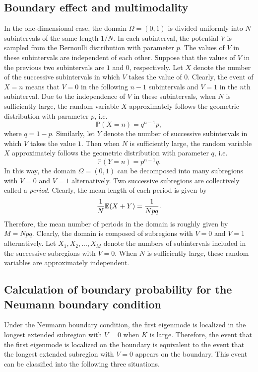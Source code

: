 \documentclass[a4paper,11pt]{article}
\begin{document}
\begin{appendices}
\section{Boundary effect and multimodality}\label{appB}
In the one-dimensional case, the domain $\Omega = (0, 1)$ is divided uniformly into $N$ subintervals of the same length $1/N$. In each subinterval, the potential $V$ is sampled from the Bernoulli distribution with parameter $p$. The values of $V$ in these subintervals are independent of each other. Suppose that the values of $V$ in the previous two subintervals are $1$ and $0$, respectively. Let $X$ denote the number of the successive subintervals in which $V$ takes the value of $0$. Clearly, the event of $X = n$ means that $V = 0$ in the following $n-1$ subintervals and $V = 1$ in the $n$th subinterval. Due to the independence of $V$ in these subintervals, when $N$ is sufficiently large, the random variable $X$ approximately follows the geometric distribution with parameter $p$, i.e.
\begin{equation*}
\mathbb{P}(X = n) = q^{n-1} p,
\end{equation*}
where $q = 1 - p$. Similarly, let $Y$ denote the number of successive subintervals in which $V$ takes the value $1$. Then when $N$ is sufficiently large, the random variable $X$ approximately follows the geometric distribution with parameter $q$, i.e.
\begin{equation*}
\mathbb{P}(Y = n) = p^{n-1} q.
\end{equation*}
In this way, the domain $\Omega = (0,1)$ can be decomposed into many subregions with $V = 0$ and $V = 1$ alternatively. Two successive subregions are collectively called a \emph{period}. Clearly, the mean length of each period is given by
\begin{equation*}
\frac{1}{N}\mathbb{E}(X+Y) = \frac{1}{Npq}.
\end{equation*}
Therefore, the mean number of periods in the domain is roughly given by $M = N p q$. Clearly, the domain is composed of subregions with $V = 0$ and $V = 1$ alternatively. Let $X_1, X_2, ..., X_M$ denote the numbers of subintervals included in the successive subregions with $V = 0$. When $N$ is sufficiently large, these random variables are approximately independent.

\subsection{Calculation of boundary probability for the Neumann boundary condition}\label{appB1}
Under the Neumann boundary condition, the first eigenmode is localized in the longest extended subregion with $V = 0$ when $K$ is large. Therefore, the event that the first eigenmode is localized on the boundary is equivalent to the event that the longest extended subregion with $V = 0$ appears on the boundary. This event can be classified into the following three situations.


\end{appendices}
\end{document}
